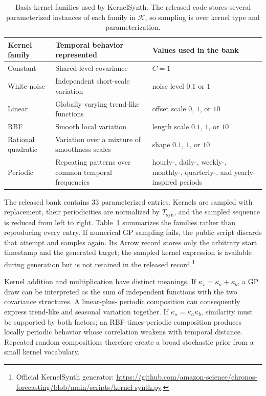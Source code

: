 \begin{table}[H]
\centering
\small
\renewcommand{\arraystretch}{1.08}
\begin{tabular}{@{}p{}p{}p{}@{}}
\toprule
Kernel family & Temporal behavior represented & Values used in the bank \\
\midrule
Constant & Shared level covariance & $C=1$ \\
White noise & Independent short-scale variation & noise level $0.1$ or $1$ \\
Linear & Globally varying trend-like functions & offset scale $0$, $1$, or $10$ \\
RBF & Smooth local variation & length scale $0.1$, $1$, or $10$ \\
Rational quadratic & Variation over a mixture of smoothness scales &
shape $0.1$, $1$, or $10$ \\
Periodic & Repeating patterns over common temporal frequencies &
hourly-, daily-, weekly-, monthly-, quarterly-, and yearly-inspired periods \\
\bottomrule
\end{tabular}
\caption{Basis-kernel families used by KernelSynth. The released code stores
several parameterized instances of each family in $\mathcal K$, so sampling is
over kernel type and parameterization.}
\label{tab:kernelsynth-bank}
\end{table}

The released bank contains 33 parameterized entries. Kernels are sampled with
replacement, their periodicities are normalized by $T_{\mathrm{syn}}$, and the
sampled sequence is reduced from left to right. Table~\ref{tab:kernelsynth-bank}
summarizes the families rather than reproducing every entry. If numerical GP
sampling fails, the public script discards that attempt and samples again.
Its Arrow record stores only the arbitrary start timestamp and the generated
target; the sampled kernel expression is available during generation but is
not retained in the released record.\footnote{Official KernelSynth generator:
\url{https://github.com/amazon-science/chronos-forecasting/blob/main/scripts/kernel-synth.py}.}

Kernel addition and multiplication have distinct meanings. If
$\kappa_\star=\kappa_a+\kappa_b$, a GP draw can be interpreted as the sum of
independent functions with the two covariance structures. A linear-plus-
periodic composition can consequently express trend-like and seasonal
variation together. If
$\kappa_\star=\kappa_a\kappa_b$, similarity must be supported by both factors;
an RBF-times-periodic composition produces locally periodic behavior whose
correlation weakens with temporal distance. Repeated random compositions
therefore create a broad stochastic prior from a small kernel vocabulary.

